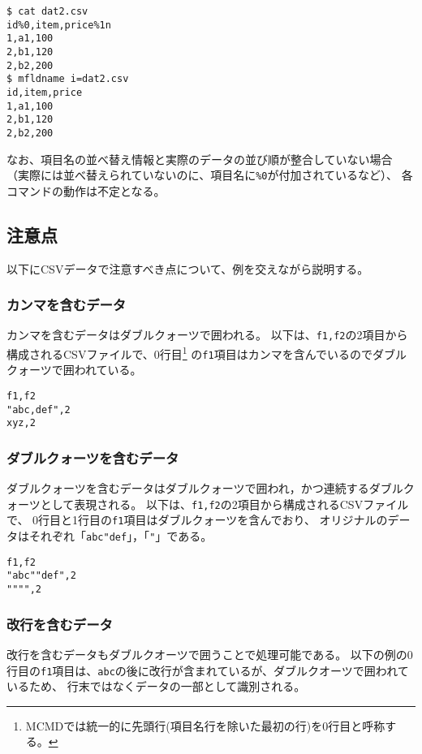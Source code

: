 \begin{Verbatim}[baselinestretch=0.7,frame=single]
$ cat dat2.csv
id%0,item,price%1n
1,a1,100
2,b1,120
2,b2,200
$ mfldname i=dat2.csv
id,item,price
1,a1,100
2,b1,120
2,b2,200
\end{Verbatim}

なお、項目名の並べ替え情報と実際のデータの並び順が整合していない場合
（実際には並べ替えられていないのに、項目名に\verb|%0|が付加されているなど）、
各コマンドの動作は不定となる。


\subsection{注意点}

以下にCSVデータで注意すべき点について、例を交えながら説明する。

\subsubsection{カンマを含むデータ}
カンマを含むデータはダブルクォーツで囲われる。
以下は、\verb|f1,f2|の2項目から構成されるCSVファイルで、0行目\footnote{MCMDでは統一的に先頭行(項目名行を除いた最初の行)を0行目と呼称する。}
の\verb|f1|項目はカンマを含んでいるのでダブルクォーツで囲われている。

\begin{Verbatim}[baselinestretch=0.7,frame=single]
f1,f2
"abc,def",2
xyz,2
\end{Verbatim}

\subsubsection{ダブルクォーツを含むデータ}

ダブルクォーツを含むデータはダブルクォーツで囲われ，かつ連続するダブルクォーツとして表現される。
以下は、\verb|f1,f2|の2項目から構成されるCSVファイルで、
0行目と1行目の\verb|f1|項目はダブルクォーツを含んでおり、
オリジナルのデータはそれぞれ「\verb|abc"def|」，「\verb|"|」である。

\begin{Verbatim}[baselinestretch=0.7,frame=single]
f1,f2
"abc""def",2
"""",2
\end{Verbatim}

\subsubsection{改行を含むデータ}

改行を含むデータもダブルクオーツで囲うことで処理可能である。
以下の例の0行目の\verb|f1|項目は、\verb|abc|の後に改行が含まれているが、ダブルクオーツで囲われているため、
行末ではなくデータの一部として識別される。

